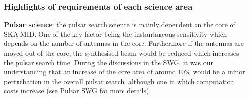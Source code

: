 \documentclass[sfheadings,a4paper,times,9pt,floats,floatfix]{article}
\begin{document}
\subsubsection{Highlights of requirements of each science area}

{\bf Pulsar science}: the pulsar search science is mainly dependent on
the core of SKA-MID. One of the key factor being the
instantaneous sensitivity which depends on the number of antennas in the core.
Furthermore if the antennas are moved out of the core, the synthesised beam would be
reduced which increases the pulsar search time. During the discussions in the SWG, it was
our understanding that an increase of the core area of around 10\% would be a minor
perturbation in the overall pulsar search, although one in which
computation costs increase (see Pulsar SWG for more details).
\end{document}
